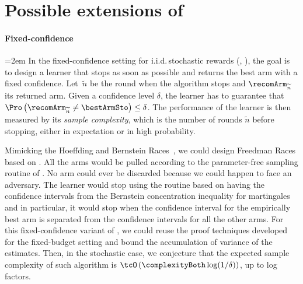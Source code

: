 \section{Possible extensions of \Pone{}}\label{s:exte}
%

%
\paragraph{Fixed-confidence}
{\emergencystretch=2em
In the fixed-confidence setting for i.i.d.\,stochastic rewards (\citealp{Maron93HR}, \citealp{Even-Dar06AE,Mnih08EB,
	Kalyanakrishnan12PA,Kaufmann13IC,Garivier16OB}), the goal is to 
design a learner that stops as soon as possible 
and returns the best arm with a fixed confidence.
Let~$\widetilde{n}$ be the round when the algorithm stops and 
$\recomArm_{\widetilde{n}}$ its returned arm. Given a 
confidence level $\delta$, the learner has to guarantee 
that $\Pro\left(\recomArm_{\widetilde{n}}\neq 
\bestArmSto\right) \leq \delta$. The performance of 
the learner is then measured by its \textit{sample 
	complexity}, which is the number of rounds $\widetilde{n}$ before stopping, 
either in expectation or in high probability.\par}

Mimicking the Hoeffding and Bernstein Races~\citep{Maron93HR,
	Mnih08EB}, we could design Freedman Races based on \Pone{}. %
All the arms would be pulled according to 
the parameter-free sampling routine of \Pone{}. No arm could ever be discarded because we could happen to face an adversary.
The learner would stop using the \Pone{} routine based on having the confidence intervals from the Bernstein concentration 
inequality for martingales and in particular, it would stop when the confidence interval for the empirically best 
arm is separated from the confidence intervals for all the other arms.
For this fixed-confidence variant of  \Pone{}, we could reuse the proof 
techniques developed for the fixed-budget setting and bound the 
accumulation of variance of the estimates. Then, in the stochastic case, we conjecture 
that the expected 
sample complexity of such  algorithm is $\tcO\left(\complexityBoth\log(1/\delta)\right)$, up to log factors. %

